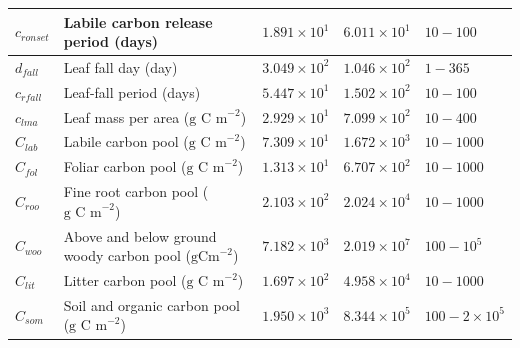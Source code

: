 \documentclass[draft,linenumbers]{agujournal}
\begin{document}
\begin{table}[ht]
\begin{center}
\begin{tabular}{| l | p{4.5cm} | p{1.7cm} | p{1.7cm} | p{1.7cm} |}
$c_{ronset}$ & Labile carbon release period (days) & $1.891\times 10^{1}$ & $6.011\times 10^{1}$ & $10 - 100$ \\ \hline
$d_{fall}$ & Leaf fall day (day) & $3.049\times 10^{2}$ & $1.046\times 10^{2}$ & $1 - 365$ \\ \hline
$c_{rfall}$ & Leaf-fall period (days) & $5.447\times 10^{1}$ & $1.502\times 10^{2}$ & $10 - 100$ \\ \hline
$c_{lma}$ & Leaf mass per area ($\text{g C m}^{-2}$) & $2.929\times 10^{1}$ & $7.099\times 10^{2}$ & $10 - 400$ \\ \hline
$C_{lab}$ & Labile carbon pool ($\text{g C m}^{-2}$) & $7.309\times 10^{1}$ & $1.672\times 10^{3}$ & $10 - 1000$ \\ \hline
$C_{fol}$ & Foliar carbon pool ($\text{g C m}^{-2}$) & $1.313\times 10^{1}$ & $6.707\times 10^{2}$ & $10 - 1000$ \\ \hline
$C_{roo}$ & Fine root carbon pool ($\text{g C m}^{-2}$) & $2.103\times 10^{2}$ & $2.024\times 10^{4}$ & $10 - 1000$ \\ \hline
$C_{woo}$ & Above and below ground woody carbon pool ($\text{gCm}^{-2}$) & $7.182\times 10^{3}$ & $2.019\times 10^{7}$ & $100 - 10^{5}$ \\ \hline
$C_{lit}$ & Litter carbon pool ($\text{g C m}^{-2}$) & $1.697\times 10^{2}$ & $4.958\times 10^{4}$ & $10 - 1000$ \\ \hline
$C_{som}$ & Soil and organic carbon pool ($\text{g C m}^{-2}$) & $1.950\times 10^{3}$ & $8.344\times 10^{5}$ & $100 - 2 \times 10^{5}$  \\ \hline
	\end{tabular}
	\label{table:xbvars}
\end{center} 
\end{table}


%
%

%
\end{document}
